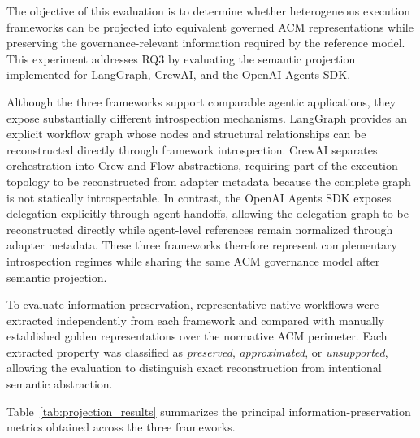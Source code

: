 \documentclass[10pt]{article}
\begin{document}
The objective of this evaluation is to determine whether heterogeneous execution frameworks can be projected into equivalent governed ACM representations while preserving the governance-relevant information required by the reference model. This experiment addresses RQ3 by evaluating the semantic projection implemented for LangGraph, CrewAI, and the OpenAI Agents SDK.

Although the three frameworks support comparable agentic applications, they expose substantially different introspection mechanisms. LangGraph provides an explicit workflow graph whose nodes and structural relationships can be reconstructed directly through framework introspection. CrewAI separates orchestration into Crew and Flow abstractions, requiring part of the execution topology to be reconstructed from adapter metadata because the complete graph is not statically introspectable. In contrast, the OpenAI Agents SDK exposes delegation explicitly through agent handoffs, allowing the delegation graph to be reconstructed directly while agent-level references remain normalized through adapter metadata. These three frameworks therefore represent complementary introspection regimes while sharing the same ACM governance model after semantic projection.

To evaluate information preservation, representative native workflows were extracted independently from each framework and compared with manually established golden representations over the normative ACM perimeter. Each extracted property was classified as \emph{preserved}, \emph{approximated}, or \emph{unsupported}, allowing the evaluation to distinguish exact reconstruction from intentional semantic abstraction.

Table~\ref{tab:projection_results} summarizes the principal information-preservation metrics obtained across the three frameworks.
\end{document}
